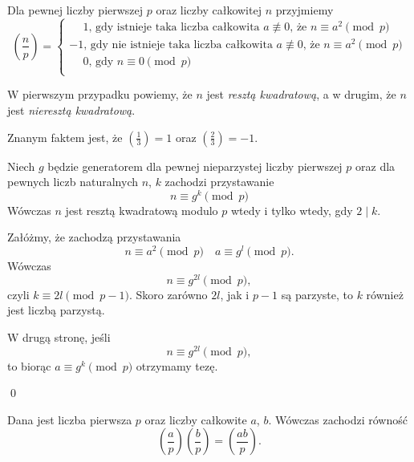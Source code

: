\newpage


\noindent
Dla pewnej liczby pierwszej $p$ oraz liczby całkowitej $n$ przyjmiemy
\[
	\left(\frac{n}{p}\right) = 
	\begin{cases}
		\phantom{-}1 \text{, gdy istnieje taka liczba całkowita } a \not\equiv 0 \text{, że } n \equiv a^2 \pmod{p}\\
		-1\text{, gdy nie istnieje taka liczba całkowita } a \not\equiv 0 \text{, że } n \equiv a^2 \pmod{p} \\
		\phantom{-}0 \text{, gdy } n \equiv 0 \pmod{p}\\
	\end{cases}
\]

\noindent
W pierwszym przypadku powiemy, że $n$ jest \textit{resztą kwadratową}, a w drugim, że $n$ jest \textit{nieresztą kwadratową}.

\vspace{10px}
\noindent
Znanym faktem jest, że $\left(\frac{1}{3}\right) = 1$ oraz $\left(\frac{2}{3}\right) = -1$.

\vspace{10px}


\noindent
Niech $g$ będzie generatorem dla pewnej nieparzystej liczby pierwszej $p$ oraz dla pewnych liczb naturalnych $n$, $k$ zachodzi przystawanie
\[
	n \equiv g^k \pmod{p}
\] 
Wówczas $n$ jest resztą kwadratową modulo $p$ wtedy i tylko wtedy, gdy $2 \mid k$.

\vspace{5px}


\noindent
Załóżmy, że zachodzą przystawania
\[
	n \equiv a^2 \pmod{p} \quad a \equiv g^l \pmod{p}.
\]
Wówczas
\[
	n \equiv g^{2l} \pmod{p},
\]
czyli $k \equiv 2l \pmod{p - 1}$. Skoro zarówno $2l$, jak i $p - 1$ są parzyste, to $k$ również jest liczbą parzystą.

\vspace{10px}
\noindent
W drugą stronę, jeśli
\[
	n \equiv g^{2l} \pmod{p},
\]
to biorąc $a \equiv g^k \pmod{p}$ otrzymamy tezę.

\qed
\vspace{10px}


\noindent
Dana jest liczba pierwsza $p$ oraz liczby całkowite $a$, $b$. Wówczas zachodzi równość
\[
	\left(\frac{a}{p}\right)\left(\frac{b}{p}\right) = \left(\frac{ab}{p}\right).
\]

